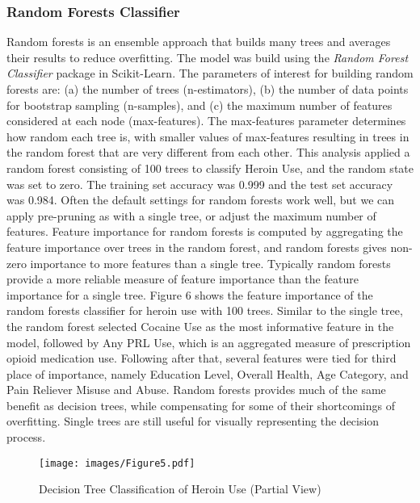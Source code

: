\documentclass[sigconf]{acmart}
\begin{document}
\subsubsection{Random Forests Classifier}

Random forests is an ensemble approach that builds many trees and averages 
their results to reduce overfitting. The model was build using the 
\emph{Random Forest Classifier} package in Scikit-Learn. The parameters of 
interest for building random forests are: (a) the number of trees 
(n-estimators), (b) the number of data points for bootstrap sampling 
(n-samples), and (c) the maximum number of features considered at each node 
(max-features). The max-features parameter determines how random each tree is, 
with smaller values of max-features resulting in trees in the random forest 
that are very different from each other. This analysis applied a random forest 
consisting of 100 trees to classify Heroin Use, and the random state was set to 
zero. The training set accuracy was 0.999 and the test set accuracy was 0.984. 
Often the default settings for random forests work well, but we can apply
pre-pruning as with a single tree, or adjust the maximum number of features. 
Feature importance for random forests is computed by aggregating the feature 
importance over trees in the random forest, and random forests gives
non-zero importance to more features than a single tree. Typically random
forests provide a more reliable measure of feature importance than the
feature importance for a single tree. Figure 6 shows the feature importance 
of the random forests classifier for heroin use with 100 trees. Similar to
the single tree, the random forest selected Cocaine Use as the most
informative feature in the model, followed by Any PRL Use, which is an 
aggregated measure of prescription opioid medication use. Following after 
that, several features were tied for third place of importance, namely 
Education Level, Overall Health, Age Category, and Pain Reliever Misuse 
and Abuse. Random forests provides much of the same benefit as decision
trees, while compensating for some of their shortcomings of overfitting.
Single trees are still useful for visually representing the decision process.

\begin{figure}[!ht]
  \centering\texttt{[image: images/Figure5.pdf]}
  \caption{Decision Tree Classification of Heroin Use (Partial View)}
  \label{f:Figure5}
\end{figure}
\end{document}
